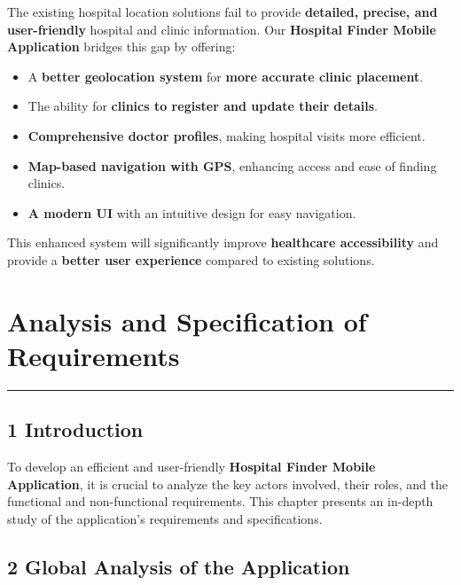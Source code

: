 \documentclass[12pt]{report}
\begin{document}
The existing hospital location solutions fail to provide \textbf{detailed, precise, and user-friendly} hospital and clinic information. Our \textbf{Hospital Finder Mobile Application} bridges this gap by offering:
\begin{itemize}
	\item A \textbf{better geolocation system} for \textbf{more accurate clinic placement}.
	\item The ability for \textbf{clinics to register and update their details}.
	\item \textbf{Comprehensive doctor profiles}, making hospital visits more efficient.
	\item \textbf{Map-based navigation with GPS}, enhancing access and ease of finding clinics.
	\item \textbf{A modern UI} with an intuitive design for easy navigation.
\end{itemize}

\noindent This enhanced system will significantly improve \textbf{healthcare accessibility} and provide a \textbf{better user experience} compared to existing solutions.











\newpage

\chapter{\textbf{Analysis and Specification of Requirements}}
\rule{\linewidth}{1.5pt}  %

\section*{\textbf{1 Introduction}}


\noindent To develop an efficient and user-friendly \textbf{Hospital Finder Mobile Application}, it is crucial to analyze the key actors involved, their roles, and the functional and non-functional requirements. This chapter presents an in-depth study of the application’s requirements and specifications.

\section*{\textbf{2 Global Analysis of the Application}}
\end{document}
